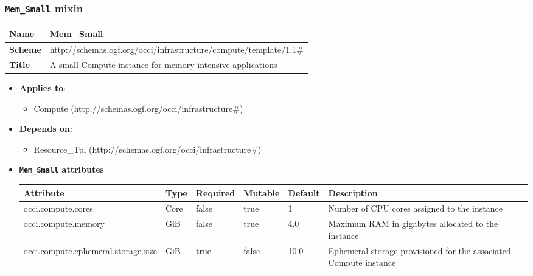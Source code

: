  
\subsubsection{\texttt{Mem\_Small} mixin}
\begin{center}
\begin{tabular}{|l|l|}
  \hline
  \textbf{Name} & Mem\_Small \\
  \hline  
  \textbf{Scheme} & http://schemas.ogf.org/occi/infrastructure/compute/template/1.1\# \\
  \hline
  \textbf{Title} & A small Compute instance for memory-intensive applications \\
  \hline
\end{tabular}
\end{center}
\begin{itemize}
\item \textbf{Applies to}:
\begin{itemize}
	\item Compute (http://schemas.ogf.org/occi/infrastructure\#)
\end{itemize}
\end{itemize} 
\begin{itemize}
\item \textbf{Depends on}:
\begin{itemize}
	\item Resource\_Tpl (http://schemas.ogf.org/occi/infrastructure\#)
\end{itemize}
\end{itemize}

\begin{itemize}
\item \textbf{\texttt{Mem\_Small} attributes}

\begin{tabularx}{\textwidth}{|l|l|p{1.4cm}|p{1.3cm}|l|X|}
  \hline
  \textbf{Attribute} & \textbf{Type} & \textbf{Required} & \textbf{Mutable} & \textbf{Default} & \textbf{Description} \\
  \hline  
  occi.compute.cores & Core & false & true & 1 & Number of CPU cores assigned to the instance \\
  \hline
  occi.compute.memory & GiB & false & true & 4.0 & Maximum RAM in gigabytes allocated to the instance \\
  \hline
  occi.compute.ephemeral.storage.size & GiB & true & false & 10.0 & Ephemeral storage provisioned for the associated Compute instance \\
  \hline
\end{tabularx}
\end{itemize}



